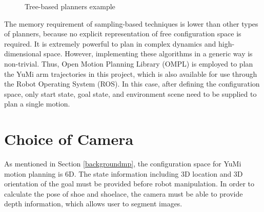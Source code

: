 \begin{figure}[H]
\centering
{}
\caption{Tree-based planners example \citep{OMPLPrim20:online}}
\label{tree}
\end{figure}

The memory requirement of sampling-based techniques is lower than other types of planners, because no explicit representation of free configuration space is required. It is extremely powerful to plan in complex dynamics and high-dimensional space. However, implementing these algorithms in a generic way is non-trivial. Thus, Open Motion Planning Library (OMPL) \citep{OMPL} is employed to plan the YuMi arm trajectories in this project, which is also available for use through the Robot Operating System (ROS).
In this case, after defining the configuration space, only start state, goal state, and environment scene need to be supplied to plan a single motion. 

\section{Choice of Camera}
As mentioned in Section \ref{backgroundmp}, the configuration space for YuMi motion planning is 6D. The state information including 3D location and 3D orientation of the goal must be provided before robot manipulation. In order to calculate the pose of shoe and shoelace, the camera must be able to provide depth information, which allows user to segment images. 

